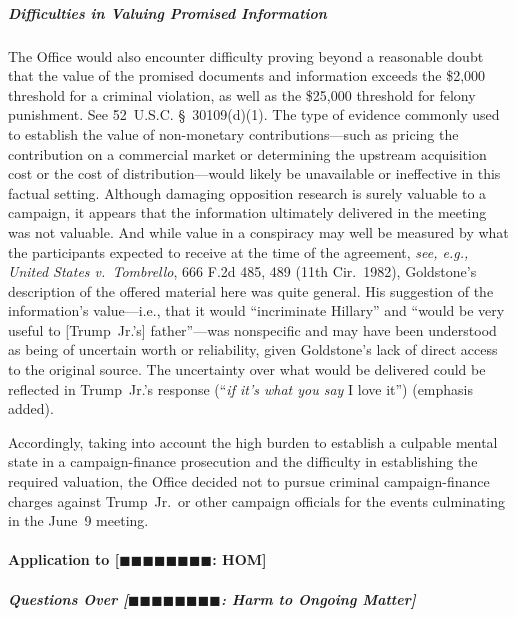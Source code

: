 \subparagraph{Difficulties in Valuing Promised Information}
The Office would also encounter difficulty proving beyond a reasonable doubt that the value of the promised documents and information exceeds the \$2,000 threshold for a criminal violation, as well as the \$25,000 threshold for felony punishment.
See 52~U.S.C. \S~30109(d)(1).
The type of evidence commonly used to establish the value of non-monetary contributions---such as pricing the contribution on a commercial market or determining the upstream acquisition cost or the cost of distribution---would likely be unavailable or ineffective in this factual setting.
Although damaging opposition research is surely valuable to a campaign, it appears that the information ultimately delivered in the meeting was not valuable.
And while value in a conspiracy may well be measured by what the participants expected to receive at the time of the agreement, \textit{see, e.g., United States v.\ Tombrello}, 666 F.2d 485, 489 (11th Cir.~1982), Goldstone's description of the offered material here was quite general.
His suggestion of the information's value---i.e., that it would ``incriminate Hillary'' and ``would be very useful to [Trump~Jr.'s] father''---was nonspecific and may have been understood as being of uncertain worth or reliability, given Goldstone's lack of direct access to the original source.
The uncertainty over what would be delivered could be reflected in Trump~Jr.'s response (``\textit{if it's what you say} I love it'') (emphasis added).

Accordingly, taking into account the high burden to establish a culpable mental state in a campaign-finance prosecution and the difficulty in establishing the required valuation, the Office decided not to pursue criminal campaign-finance charges against Trump~Jr.\ or other campaign officials for the events culminating in the June~9 meeting.

\paragraph{Application to [$\blacksquare\blacksquare\blacksquare\blacksquare\blacksquare\blacksquare\blacksquare\blacksquare$: HOM]}

\subparagraph{Questions Over [$\blacksquare\blacksquare\blacksquare\blacksquare\blacksquare\blacksquare\blacksquare\blacksquare$: Harm to Ongoing Matter]}


